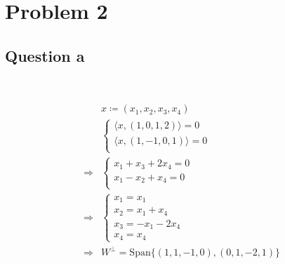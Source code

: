 \documentclass{article}
\begin{document}
\newpage

\section{Problem 2}

\subsection{Question a}

~

\begin{equation*}
    \begin{split}
        &x\coloneqq(x_1,x_2,x_3,x_4)\\
        &\begin{cases}
            \langle x,(1,0,1,2)\rangle =0\\
            \langle x,(1,-1,0,1)\rangle=0\\
        \end{cases}\\
        \Rightarrow&\begin{cases}
            x_1+x_3+2x_4=0\\
            x_1-x_2+x_4=0\\
        \end{cases}\\
        \Rightarrow&\begin{cases}
            x_1=x_1\\
            x_2=x_1+x_4\\
            x_3=-x_1-2x_4\\
            x_4=x_4
        \end{cases}\\
        \Rightarrow& W^\perp=\text{Span}\{(1,1,-1,0),(0,1,-2,1)\}\\
    \end{split}
\end{equation*}
\end{document}
